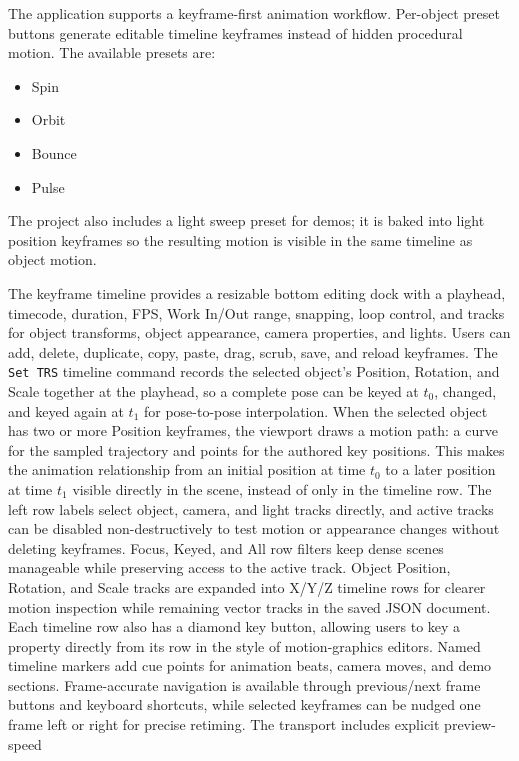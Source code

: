 \documentclass[12pt,a4paper]{article}
\begin{document}
The application supports a keyframe-first animation workflow. Per-object preset
buttons generate editable timeline keyframes instead of hidden procedural
motion. The available presets are:
\begin{itemize}
  \item Spin
  \item Orbit
  \item Bounce
  \item Pulse
\end{itemize}

The project also includes a light sweep preset for demos; it is baked into light
position keyframes so the resulting motion is visible in the same timeline as
object motion.

The keyframe timeline provides a resizable bottom editing dock with a playhead,
timecode, duration, FPS, Work In/Out range, snapping, loop control, and tracks
for object transforms, object appearance, camera properties, and lights. Users
can add, delete, duplicate, copy, paste, drag, scrub, save, and reload
keyframes.
The \texttt{Set TRS} timeline command records the selected object's Position,
Rotation, and Scale together at the playhead, so a complete pose can be keyed at
\(t_0\), changed, and keyed again at \(t_1\) for pose-to-pose interpolation.
When the selected object has two or more Position keyframes, the viewport draws
a motion path: a curve for the sampled trajectory and points for the authored
key positions. This makes the animation relationship from an initial position
at time \(t_0\) to a later position at time \(t_1\) visible directly in the
scene, instead of only in the timeline row.
The left row labels select object, camera, and light tracks directly, and active
tracks can be disabled non-destructively to test motion or appearance changes
without deleting keyframes. Focus, Keyed, and All row filters keep dense scenes
manageable while preserving access to the active track. Object Position,
Rotation, and Scale tracks are expanded into X/Y/Z timeline rows for clearer
motion inspection while remaining vector tracks in the saved JSON document.
Each timeline row also
has a diamond key button, allowing users to key a property directly from its row
in the style of motion-graphics editors. Named timeline markers add cue points
for animation beats, camera moves, and demo sections.
Frame-accurate navigation is available through previous/next frame buttons and
keyboard shortcuts, while selected keyframes can be nudged one frame left or
right for precise retiming. The transport includes explicit preview-speed
\end{document}
